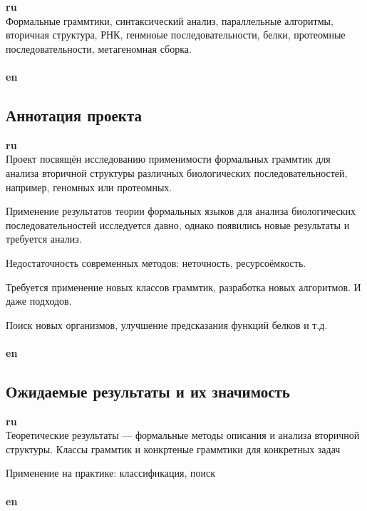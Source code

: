 \documentclass[12pt]{article}  %
\theoremstyle{remark}
\begin{document}
\textbf{ru}\\
Формальные граммтики, синтаксический анализ, параллельные алгоритмы, вторичная структура, РНК, генмноые последовательности, белки, протеомные последовательности, метагеномная сборка.
\\
\\
\textbf{en}\\


\subsection{Аннотация проекта }
\textbf{ru}\\
Проект посвящён исследованию применимости формальных граммтик для анализа вторичной структуры различных биологических последовательностей, например, геномных или протеомных.

Применение результатов теории формальных языков для анализа биологических последовательностей исследуется давно, однако появились новые результаты и требуется анализ.

Недостаточность современных методов: неточность, ресурсоёмкость.

Требуется применение новых классов граммтик, разработка новых алгоритмов.
И даже подходов.

Поиск новых организмов, улучшение предсказания функций белков и т.д.
\\
\\
\textbf{en}\\


\subsection{Ожидаемые результаты и их значимость}

\textbf{ru}\\
Теоретические результаты --- формальные методы описания и анализа вторичной структуры.
Классы граммтик и конкртеные граммтики для конкретных задач

Применение на практике: классификация, поиск
\\
\\
\textbf{en}\\
\end{document}
